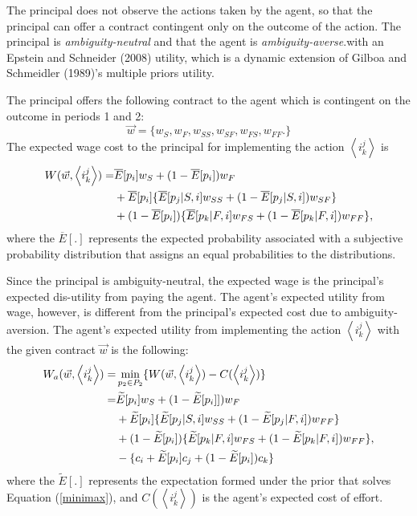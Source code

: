 \documentclass[11pt]{article} %
\theoremstyle{exampstyle}
\newcommand{\eq}[1]{\begin{align}#1\end{align}}
\newcommand{\la}{ \left < }
\newcommand{\ra}{ \right > }
\begin{document}
The principal does not observe the actions taken by the agent, so that the principal can offer a contract contingent only on the outcome of the action. The principal is \emph{ambiguity-neutral} and that the agent is \emph{ambiguity-averse}.with an \nocite{ES:2010} Epstein and Schneider (2008) utility, which is a dynamic extension of \nocite{GS:1989} Gilboa and Schmeidler (1989)'s multiple priors utility. 

The principal offers the following contract to the agent which is contingent on the outcome in periods 1 and 2:
%
\[ \vec{w} =\{ w_S, w_F, w_{SS}, w_{SF}, w_{FS}, w_{FF}. \}\]
%
The expected wage cost to the principal for implementing the action $\la i^j_k \ra$ is 
%
\eq{
W(\vec{w}, \la i^j_k \ra) =& \overline{E}[p_i]w_S + (1-\overline{E}[p_i] ) w_F  \\
& +\overline{E}[p_i]  \{ \overline{E}[p_j | S,i] w_{SS} + (1-\overline{E}[p_j | S,i] )w_{SF} \}     \notag \\
& +(1-\overline{E}[p_i] ) \{ \overline{E}[p_k|F,i] w_{FS} + (1-\overline{E}[p_k|F,i]) w_{FF} \} , \notag
}
where the $ \overline{E}[.]  $ represents the expected probability associated with a subjective probability distribution that assigns an equal probabilities to the distributions. 

Since the principal is ambiguity-neutral, the expected wage is the principal's expected dis-utility from paying the agent. The agent's expected utility from wage, however, is different from the principal's expected cost due to ambiguity-aversion. The agent's expected utility from implementing the action $\la i^j_k \ra$  with the given contract $\vec{w}$ is the following:
%
\eq{
\label{minimax}
W_a(\vec{w}, \la i^j_k \ra) =& \min_{p_2 \in P_2} \{W(\vec{w}, \la i^j_k \ra)  - C(\la i^j_k \ra) \} \\
=& \widetilde{E}[p_i]w_S + (1-\widetilde{E}[p_i]])w_F  \notag \\
&+\widetilde{E}[p_i] \{ \widetilde{E}[p_j | S,i] w_{SS} + (1-\widetilde{E}[p_j | F,i] ) w_{FF} \}      \notag \\
&+(1-\widetilde{E}[p_i]) \{ \widetilde{E}[p_k|F,i] w_{FS} + (1-\widetilde{E}[p_k|F,i])w_{FF} \} , \notag \\
&- \{ c_i + \widetilde{E}[p_i] c_j + (1-\widetilde{E}[p_i]) c_k \} \notag 
}
where the $\widetilde{E}[.]$ represents the expectation formed under the prior that solves Equation (\ref{minimax}), and $C(\la i^j_k \ra)$ is the agent's expected cost of effort.
\end{document}
